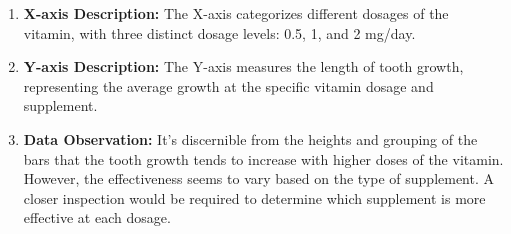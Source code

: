 \documentclass{article}\usepackage[]{graphicx}\usepackage[]{xcolor}
\begin{document}
\begin{enumerate}
    \item \textbf{X-axis Description:} The X-axis categorizes different dosages of the vitamin, with three distinct dosage levels: 0.5, 1, and 2 mg/day.
    
    \item \textbf{Y-axis Description:} The Y-axis measures the length of tooth growth, representing the average growth at the specific vitamin dosage and supplement.
    \item \textbf{Data Observation:} It's discernible from the heights and grouping of the bars that the tooth growth tends to increase with higher doses of the vitamin. However, the effectiveness seems to vary based on the type of supplement. A closer inspection would be required to determine which supplement is more effective at each dosage.
\end{enumerate}
\end{document}

